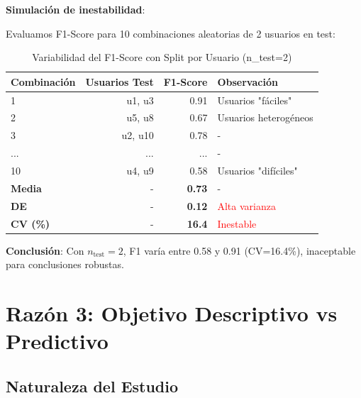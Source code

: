 \documentclass[12pt,letterpaper,twoside]{report}
\begin{document}
\begin{calculobox}
\textbf{Simulación de inestabilidad}:

Evaluamos F1-Score para 10 combinaciones aleatorias de 2 usuarios en test:

\begin{table}[H]
\centering
\caption{Variabilidad del F1-Score con Split por Usuario (n\_test=2)}
\label{tab:split_instability}
\begin{tabular}{@{}lrrl@{}}
\toprule
\textbf{Combinación} & \textbf{Usuarios Test} & \textbf{F1-Score} & \textbf{Observación} \\
\midrule
1 & u1, u3  & 0.91 & Usuarios "fáciles" \\
2 & u5, u8  & 0.67 & Usuarios heterogéneos \\
3 & u2, u10 & 0.78 & - \\
... & ... & ... & - \\
10 & u4, u9  & 0.58 & Usuarios "difíciles" \\
\midrule
\textbf{Media} & - & \textbf{0.73} & - \\
\textbf{DE} & - & \textbf{0.12} & \textcolor{red}{Alta varianza} \\
\textbf{CV (\%)} & - & \textbf{16.4} & \textcolor{red}{Inestable} \\
\bottomrule
\end{tabular}
\end{table}

\textbf{Conclusión}: Con $n_{\text{test}}=2$, F1 varía entre 0.58 y 0.91 (CV=16.4\%), inaceptable para conclusiones robustas.
\end{calculobox}

\section{Razón 3: Objetivo Descriptivo vs Predictivo}

\subsection{Naturaleza del Estudio}
\end{document}
